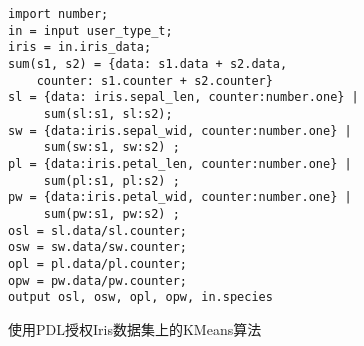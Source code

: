 \begin{figure}[h]
\centering
\begin{lstlisting}
import number;
in = input user_type_t;
iris = in.iris_data;
sum(s1, s2) = {data: s1.data + s2.data, 
    counter: s1.counter + s2.counter}
sl = {data: iris.sepal_len, counter:number.one} |
     sum(sl:s1, sl:s2);
sw = {data:iris.sepal_wid, counter:number.one} |
     sum(sw:s1, sw:s2) ;
pl = {data:iris.petal_len, counter:number.one} |
     sum(pl:s1, pl:s2) ;
pw = {data:iris.petal_wid, counter:number.one} |
     sum(pw:s1, pw:s2) ;
osl = sl.data/sl.counter;
osw = sw.data/sw.counter;
opl = pl.data/pl.counter;
opw = pw.data/pw.counter;
output osl, osw, opl, opw, in.species
\end{lstlisting}
\caption{使用PDL授权Iris数据集上的KMeans算法}
\label{fig:pdl}
\end{figure} 